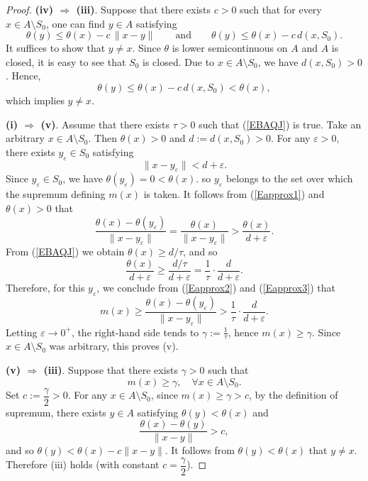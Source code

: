 \documentclass[11pt]{article}
\begin{document}
\begin{proof}
	
	\noindent\textbf{(iv) $\Rightarrow$ (iii)}.  Suppose that there exists   \(c >0\) such that for every \(x\in A\setminus S_0\), one can find  \(y\in A\) satisfying
	\[
	\theta(y) \le \theta(x) - c \,\|x-y\| \qquad\text{and}\qquad \theta(y) \le \theta(x) - c \,d(x,S_0).
	\]
	It suffices to show that $y\neq x$.
	Since $\theta$ is lower semicontinuous on $A$ and $A$ is closed, it is easy to see that $S_0$ is closed.  Due to \(x\in A\setminus S_0\), we have $d(x,S_0) >0$.  Hence, 
	$$\theta(y) \le \theta(x) - c \,d(x,S_0) <  \theta(x), $$
	which implies $y\neq x$.
	
	
	
	
	\noindent\textbf{(i) $\Rightarrow$ (v)}.
	Assume that there exists \(\tau>0\) such that   (\ref{EBAQJ}) is true.
	Take an arbitrary \(x\in A\setminus S_0\). Then \(\theta(x)>0\)  and	$	d:=d(x,S_0)>0 .$
	For any \(\varepsilon>0\), there exists \(y_\varepsilon\in S_0\) satisfying
	\begin{equation}\label{Eapprox1}
		\|x-y_\varepsilon\|<d+\varepsilon .
	\end{equation}
	Since \(y_\varepsilon\in S_0\), we have \(\theta(y_\varepsilon)=0<\theta(x)\).  so \(y_\varepsilon\) belongs to the set over which the supremum defining \(m(x)\) is taken.   It follows from  (\ref{Eapprox1})   and    \(\theta(x)>0\)  that
	\begin{equation}\label{Eapprox2}
		\frac{\theta(x)-\theta(y_\varepsilon)}{\|x-y_\varepsilon\|}=\frac{\theta(x)}{\|x-y_\varepsilon\|}>\frac{\theta(x)}{d+\varepsilon}.
	\end{equation}
	From (\ref{EBAQJ}) we obtain \(\theta(x)\ge d/\tau\), and so
	\begin{equation}\label{Eapprox3}
		\frac{\theta(x)}{d+\varepsilon}\ge\frac{d/\tau}{d+\varepsilon}=\frac{1}{\tau}\cdot\frac{d}{d+\varepsilon}.
	\end{equation}
	Therefore, for this \(y_\varepsilon\),  we conclude from  (\ref{Eapprox2})  and  (\ref{Eapprox3})  that
	\[
	m(x)\ge\frac{\theta(x)-\theta(y_\varepsilon)}{\|x-y_\varepsilon\|}>\frac{1}{\tau}\cdot\frac{d}{d+\varepsilon}.
	\]
	Letting \(\varepsilon\to0^{+}\), the right-hand side tends to \(\gamma:=\frac{1}{\tau}\),  hence \(m(x)\ge \gamma\). Since \(x\in A\setminus S_0\) was arbitrary, this proves (v).
	
	
	\noindent\textbf{(v) $\Rightarrow$ (iii)}.
	Suppose   that there exists   \(\gamma >0\) such that
	\[
	m(x)\ge \gamma,\quad \forall x\in A\setminus S_0.
	\]
	Set \(c :=\dfrac{\gamma}{2}>0\). For any \(x\in A\setminus S_0\), since \(m(x)\ge \gamma > c\), by the definition of supremum, there exists \(y\in A\) satisfying \(\theta(y)<\theta(x)\) and
	\[
	\frac{\theta(x)-\theta(y)}{\|x-y\|} > c,
	\]
	and so \(\theta(y) < \theta(x) - c \|x-y\|\).   It follows from \(\theta(y)<\theta(x)\)  that    \(y\neq x\). Therefore (iii) holds (with constant \(c =\dfrac{\gamma}{2}\)).
	

\end{proof}
\end{document}
